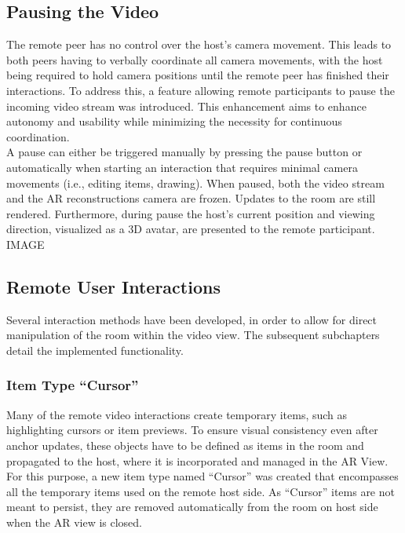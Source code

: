\documentclass{article}
\begin{document}
\subsection{Pausing the Video}
The remote peer has no control over the host's camera movement. This leads to both peers having to verbally coordinate all camera movements, with the host being required to hold camera positions until the remote peer has finished their interactions. To address this, a feature allowing remote participants to pause the incoming video stream was introduced. This enhancement aims to enhance autonomy and usability while minimizing the necessity for continuous coordination.\\
A pause can either be triggered manually by pressing the pause button or automatically when starting an interaction that requires minimal camera movements (i.e., editing items, drawing). When paused, both the video stream and the AR reconstructions camera are frozen. Updates to the room are still rendered. Furthermore, during pause the host's current position and viewing direction, visualized as a 3D avatar, are presented to the remote participant.
IMAGE
\subsection{Remote User Interactions}
Several interaction methods have been developed, in order to allow for direct manipulation of the room within the video view. The subsequent subchapters detail the implemented functionality.\\

\subsubsection{Item Type “Cursor”}
Many of the remote video interactions create temporary items, such as highlighting cursors or item previews. To ensure visual consistency even after anchor updates, these objects have to be defined as items in the room and propagated to the host, where it is incorporated and managed in the AR View. For this purpose, a new item type named “Cursor” was created that encompasses all the temporary items used on the remote host side. As “Cursor” items are not meant to persist, they are removed automatically from the room on host side when the AR view is closed. 
\end{document}

